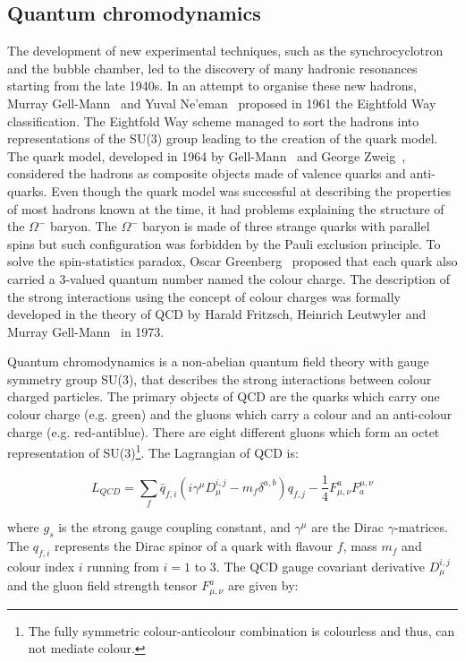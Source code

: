\subsection{Quantum chromodynamics}\label{sec:Physics_SI_QCD}

The development of new experimental techniques, such as the synchrocyclotron and the bubble chamber, led to the discovery of many hadronic resonances starting from the late 1940s. In an attempt to organise these new hadrons, Murray Gell-Mann~\cite{EightFoldWay_1} and Yuval Ne'eman~\cite{EightFoldWay_2} proposed in 1961 the Eightfold Way classification. The Eightfold Way scheme managed to sort the hadrons into representations of the SU(3) group leading to the creation of the quark model. The quark model, developed in 1964 by Gell-Mann~\cite{QuarkModel_1} and George Zweig~\cite{QuarkModel_2}, considered the hadrons as composite objects made of valence quarks and anti-quarks. Even though the quark model was successful at describing the properties of most hadrons known at the time, it had problems explaining the structure of the $\Omega^{-}$ baryon. The $\Omega^{-}$ baryon is made of three strange quarks with parallel spins but such configuration was forbidden by the Pauli exclusion principle. To solve the spin-statistics paradox, Oscar Greenberg~\cite{ColourCharge} proposed that each quark also carried a 3-valued quantum number named the colour charge. The description of the strong interactions using the concept of colour charges was formally developed in the theory of QCD by Harald Fritzsch, Heinrich Leutwyler and Murray Gell-Mann~\cite{QCD} in 1973.

Quantum chromodynamics is a non-abelian quantum field theory with gauge symmetry group SU(3), that describes the strong interactions between colour charged particles. The primary objects of QCD are the quarks which carry one colour charge (e.g. green) and the gluons which carry a colour and an anti-colour charge (e.g. red-antiblue). There are eight different gluons which form an octet representation of SU(3)\footnote{The fully symmetric colour-anticolour combination is colourless and thus, can not mediate colour.}. The Lagrangian of QCD is:

\begin{equation}
  L_{QCD} = \sum_{f}\bar{q}_{f,i}\left(i\gamma^{\mu}D_{\mu}^{i,j} - m_{f}\delta^{a,b}\right)q_{f,j} - \frac{1}{4}F^{a}_{\mu,\nu}F_{a}^{\mu,\nu}
  \label{eq:QCDLagrangian}
\end{equation}

where $g_{s}$ is the strong gauge coupling constant, and $\gamma^{\mu}$ are the Dirac $\gamma$-matrices. The $q_{f,i}$ represents the Dirac spinor of a quark with flavour $f$, mass $m_{f}$ and colour index $i$ running from $i=1$ to 3. The QCD gauge covariant derivative $D_{\mu}^{i,j}$ and the gluon field strength tensor $F^{a}_{\mu,\nu}$ are given by:


